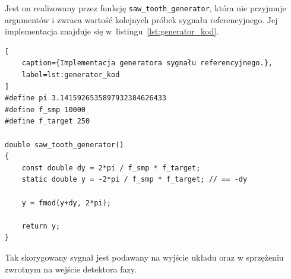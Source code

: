 \noindent Jest on realizowany przez funkcję \texttt{saw\_tooth\_generator}, która
nie przyjmuje argumentów i zwraca wartość kolejnych próbek sygnału
referencyjnego. Jej implementacja znajduje się
w~listingu~\ref{lst:generator_kod}.

\begin{lstlisting}[
    caption={Implementacja generatora sygnału referencyjnego.},
    label=lst:generator_kod
]
#define pi 3.1415926535897932384626433
#define f_smp 10000
#define f_target 250

double saw_tooth_generator()
{
    const double dy = 2*pi / f_smp * f_target;
    static double y = -2*pi / f_smp * f_target; // == -dy

    y = fmod(y+dy, 2*pi);

    return y;
}

\end{lstlisting}

\noindent Tak skorygowany sygnał jest podawany na wyjście układu oraz w
sprzężeniu zwrotnym na wejście detektora fazy.
